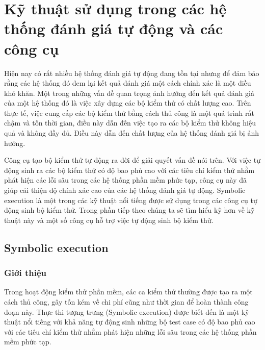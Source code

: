 \documentclass[12pt,a4paper]{report}
\begin{document}
\chapter{Kỹ thuật sử dụng trong các hệ thống đánh giá tự động và các công cụ}
Hiện nay có rất nhiều hệ thống đánh giá tự động đang tồn tại nhưng để đảm bảo rằng các hệ thống đó đem lại kết quả đánh giá một cách chính xác là một điều khó khăn. Một trong những vấn đề quan trọng ảnh hưởng đến kết quả đánh giá của một hệ thống đó là việc xây dựng các bộ kiểm thử có chất lượng cao. Trên thực tế, việc cung cấp các bộ kiểm thử bằng cách thủ công là một quá trình rất chậm và tốn thời gian, điều này dẫn đến việc tạo ra các bộ kiểm thử không hiệu quả và không đầy đủ. Điều này dẫn đến chất lượng của hệ thống đánh giá bị ảnh hưởng.

\indent Công cụ tạo bộ kiểm thử tự động ra đời để giải quyết vấn đề nói trên. Với việc tự động sinh ra các bộ kiểm thử có độ bao phủ cao với các tiêu chí kiểm thử nhằm phát hiện các lỗi sâu trong các hệ thống phần mềm phức tạp, công cụ này đã giúp cải thiện độ chính xác cao của các hệ thống đánh giá tự động. Symbolic execution là một trong các kỹ thuật nổi tiếng được sử dụng trong các công cụ tự động sinh bộ kiểm thử. Trong phần tiếp theo chúng ta sẽ tìm hiểu kỹ hơn về kỹ thuật này và một số công cụ hỗ trợ việc tự động sinh bộ kiểm thử.

\section{Symbolic execution}
\subsection{Giới thiệu}
Trong hoạt động kiểm thử phần mềm, các ca kiểm thử thường được tạo ra một cách thủ công, gây tốn kém về chi phí cũng như thời gian để hoàn thành công đoạn này. Thực thi tượng trưng (Symbolic execution) được biết đến là một kỹ thuật nổi tiếng với khả năng tự động sinh những bộ test case có độ bao phủ cao với các tiêu chí kiểm thử nhằm phát hiện những lỗi sâu trong các hệ thống phần mềm phức tạp.
\end{document}
